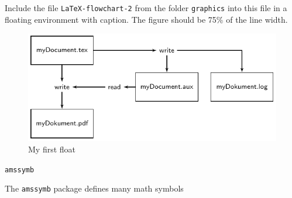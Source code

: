 \documentclass[10pt, paper=a4, abstracton]{scrartcl}
\begin{document}
Include the file \texttt{LaTeX-flowchart-2} from the folder \texttt{graphics} into this file in a floating environment with caption. The figure should be 75\% of the line width.

\begin{figure}[htbp]
	\centering
	\includegraphics[width=.75\linewidth]{../../texfiles-beamer/tex-material/WissArb-latex/LaTeX-flowchart-1.pdf}
	\caption{My first float}
	\label{fig:latex-flowchart}
\end{figure}



\texttt{amssymb}

The \texttt{amssymb} package defines many math symbols 
\end{document}
